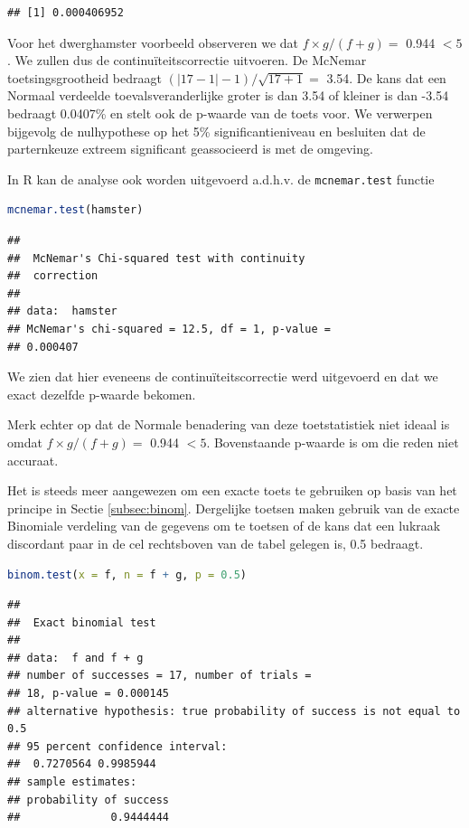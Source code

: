\documentclass[
  12pt,dutch,coursenotes]{book}
\newcommand{\passthrough}[1]{#1}
\begin{document}
\begin{lstlisting}
## [1] 0.000406952
\end{lstlisting}

Voor het dwerghamster voorbeeld observeren we dat
\(f\times g/(f+g)=\) 0.944 \(<5\).
We zullen dus de continuïteitscorrectie uitvoeren.
De McNemar toetsingsgrootheid bedraagt
\((\vert 17-1 \vert -1)/\sqrt{17+1}=\) 3.54.
De kans dat een Normaal verdeelde toevalsveranderlijke groter is
dan 3.54 of kleiner is dan -3.54 bedraagt 0.0407\% en stelt ook de p-waarde van
de toets voor. We verwerpen bijgevolg de nulhypothese op het 5\% significantieniveau en
besluiten dat de parternkeuze extreem significant geassocieerd is met de omgeving.

In R kan de analyse ook worden uitgevoerd a.d.h.v. de \passthrough{\lstinline!mcnemar.test!} functie

\begin{lstlisting}[language=R]
mcnemar.test(hamster)
\end{lstlisting}

\begin{lstlisting}
## 
##  McNemar's Chi-squared test with continuity
##  correction
## 
## data:  hamster
## McNemar's chi-squared = 12.5, df = 1, p-value =
## 0.000407
\end{lstlisting}

We zien dat hier eveneens de continuïteitscorrectie werd uitgevoerd en dat we exact dezelfde p-waarde bekomen.

Merk echter op dat de Normale benadering van deze toetstatistiek niet ideaal
is omdat \(f \times g/(f+g)=\) 0.944 \(<5\).
Bovenstaande p-waarde is om die reden niet accuraat.

Het is steeds meer aangewezen om een exacte toets te gebruiken op
basis van het principe in Sectie \ref{subsec:binom}.
Dergelijke toetsen maken
gebruik van de exacte Binomiale verdeling van de gegevens om te toetsen of
de kans dat een lukraak discordant paar in de cel rechtsboven van de tabel
gelegen is, 0.5 bedraagt.

\begin{lstlisting}[language=R]
binom.test(x = f, n = f + g, p = 0.5)
\end{lstlisting}

\begin{lstlisting}
## 
##  Exact binomial test
## 
## data:  f and f + g
## number of successes = 17, number of trials =
## 18, p-value = 0.000145
## alternative hypothesis: true probability of success is not equal to 0.5
## 95 percent confidence interval:
##  0.7270564 0.9985944
## sample estimates:
## probability of success 
##              0.9444444
\end{lstlisting}
\end{document}
